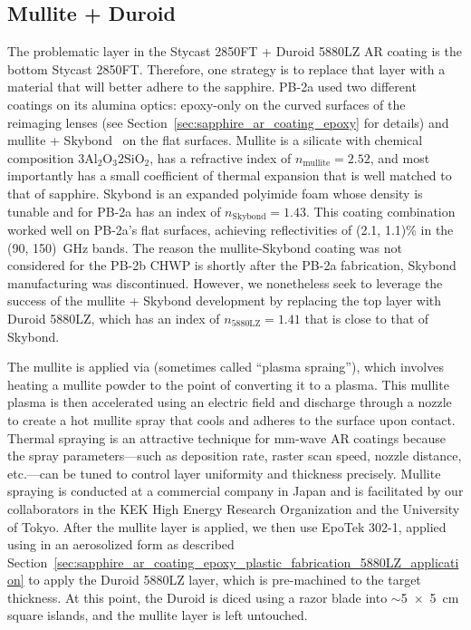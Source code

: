 
\subsection{Mullite + Duroid}
\label{sec:sapphire_ar_coating_mullite_duroid}

The problematic layer in the Stycast 2850FT + Duroid 5880LZ AR coating is the bottom Stycast 2850FT. Therefore, one strategy is to replace that layer with a material that will better adhere to the sapphire. PB-2a used two different coatings on its alumina optics: epoxy-only on the curved surfaces of the reimaging lenses (see Section~\ref{sec:sapphire_ar_coating_epoxy} for details) and mullite + Skybond~\cite{Inoue2016} on the flat surfaces. Mullite is a silicate with chemical composition $\mathrm{3Al_{2}O_{3}2SiO_{2}}$, has a refractive index of $n_{\mathrm{mullite}} = 2.52$, and most importantly has a small coefficient of thermal expansion that is well matched to that of sapphire. Skybond is an expanded polyimide foam whose density is tunable and for PB-2a has an index of $n_{\mathrm{Skybond}} = 1.43$. This coating combination worked well on PB-2a's flat surfaces, achieving reflectivities of (2.1, 1.1)\% in the (90, 150)~GHz bands. The reason the mullite-Skybond coating was not considered for the PB-2b CHWP is shortly after the PB-2a fabrication, Skybond manufacturing was discontinued. However, we nonetheless seek to leverage the success of the mullite + Skybond development by replacing the top layer with Duroid 5880LZ, which has an index of $n_{\mathrm{5880LZ}} = 1.41$ that is close to that of Skybond.

The mullite is applied via  (sometimes called ``plasma spraing''), which involves heating a mullite powder to the point of converting it to a plasma. This mullite plasma is then accelerated using an electric field and discharge through a nozzle to create a hot mullite spray that cools and adheres to the surface upon contact. Thermal spraying is an attractive technique for mm-wave AR coatings because the spray parameters---such as deposition rate, raster scan speed, nozzle distance, etc.---can be tuned to control layer uniformity and thickness precisely. Mullite spraying is conducted at a commercial company in Japan and is facilitated by our collaborators in the KEK High Energy Research Organization and the University of Tokyo. After the mullite layer is applied, we then use EpoTek 302-1, applied using in an aerosolized form as described Section~\ref{sec:sapphire_ar_coating_epoxy_plastic_fabrication_5880LZ_application} to apply the Duroid 5880LZ layer, which is pre-machined to the target thickness. At this point, the Duroid is diced using a razor blade into $\sim$5~$\times$~5~cm square islands, and the mullite layer is left untouched. 

